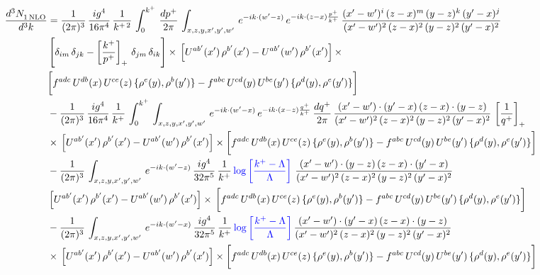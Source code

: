 \documentclass[9pt]{article}
\numberwithin{equation}{section}
\begin{document}
\begin{align}
     \frac{d^{3}N_{1\,\rm NLO}^{\rm}}{d^{3}k}  & = \frac{1}{(2\pi)^{3}}\, \frac{ig^{4}}{16\pi^{4}}\, \frac{1}{k^{+\,2}}\,\int_{0}^{k^{+}}\, \frac{dp^{+}}{2\pi}\,\int_{x,z,y,x',y',w'}\,e^{-ik\cdot (w^\prime-z)}\,e^{-ik\cdot (z-x)\frac{p^{+}}{k^{+}}}\,\frac{(x'-w')^{i}\,(z-x)^{m}\,(y-z)^{k}\,(y'-x)^{j}}{(x'-w')^{2}\,(z-x)^{2}\,(y-z)^{2}\,(y'-x)^{2}}\,\notag \\ & \left[\delta_{im}\,\delta_{jk}-\left[\frac{k^{+}}{p^{+}}\right]_{+}\, \delta_{jm}\,\delta_{ik}\right]\times\, \left[U^{ab'}(x')\,\rho^{b'}(x')-U^{ab'}(w')\,\rho^{b'}(x')\right]\times\notag \\ & \bigg[f^{adc}\,U^{db}(x)\,U^{ce}(z)\, \{\rho^{e}(y),\rho^{b}(y')\}-f^{abc}\,U^{cd}(y)\,U^{be}(y')\, \{\rho^{d}(y),\rho^{e}(y')\}\bigg]\notag \\ & -\frac{1}{(2\pi)^{3}}\, \frac{ig^{4}}{16\pi^{4}}\, \frac{1}{k^{+}}\,\int_{0}^{k^{+}}\, \int_{x,z,y,x',y',w'}\,e^{-ik\cdot (w^\prime-x)}\,e^{-ik\cdot (x-z)\frac{q^{+}}{k^{+}}}\,\frac{dq^{+}}{2\pi}\,\frac{(x'-w')\cdot (y'-x)\,(z-x)\cdot (y-z)}{(x'-w')^{2}\,(z-x)^{2}\,(y-z)^{2}\,(y'-x)^{2}}\,\left[\frac{1}{q^{+}}\right]_{+}\notag \\ & \times\, \left[U^{ab'}(x')\,\rho^{b'}(x')-U^{ab'}(w')\,\rho^{b'}(x')\right]\times \bigg[f^{adc}\,U^{db}(x)\,U^{ce}(z)\, \{\rho^{e}(y),\rho^{b}(y')\}-f^{abc}\,U^{cd}(y)\,U^{be}(y')\, \{\rho^{d}(y),\rho^{e}(y')\}\bigg]\notag \\ & -\frac{1}{(2\pi)^{3}}\, \int_{x,z,y,x',y',w'}\,e^{-ik\cdot (w^\prime-z)}\,\frac{ig^{4}}{32\pi^{5}}\, \frac{1}{k^{+}}\,{\color{blue} \log{\left[\frac{k^{+}-\Lambda}{\Lambda}\right]}}\,\,\frac{(x'-w')\cdot (y-z)\,(z-x)\cdot (y'-x)}{(x'-w')^{2}\,(z-x)^{2}\,(y-z)^{2}\,(y'-x)^{2}}\,\notag \\ & \left[U^{ab'}(x')\,\rho^{b'}(x')-U^{ab'}(w')\,\rho^{b'}(x')\right]\times\, \bigg[f^{adc}\,U^{db}(x)\,U^{ce}(z)\, \{\rho^{e}(y),\rho^{b}(y')\}-f^{abc}\,U^{cd}(y)\,U^{be}(y')\, \{\rho^{d}(y),\rho^{e}(y')\}\bigg]\notag \\ &  -\frac{1}{(2\pi)^{3}}\, \int_{x,z,y,x',y',w'}\,e^{-ik\cdot (w^\prime-x)}\,\frac{ig^{4}}{32\pi^{5}}\, \frac{1}{k^{+}}\,{\color{blue} \log{\left[\frac{k^{+}-\Lambda}{\Lambda}\right]}}\,\frac{(x'-w')\cdot (y'-x)\,(z-x)\cdot (y-z)}{(x'-w')^{2}\,(z-x)^{2}\,(y-z)^{2}\,(y'-x)^{2}}\notag \\ & \times\, \left[U^{ab'}(x')\,\rho^{b'}(x')-U^{ab'}(w')\,\rho^{b'}(x')\right]\times \bigg[f^{adc}\,U^{db}(x)\,U^{ce}(z)\, \{\rho^{e}(y),\rho^{b}(y')\}-f^{abc}\,U^{cd}(y)\,U^{be}(y')\, \{\rho^{d}(y),\rho^{e}(y')\}\bigg]
\end{align}
\end{document}
